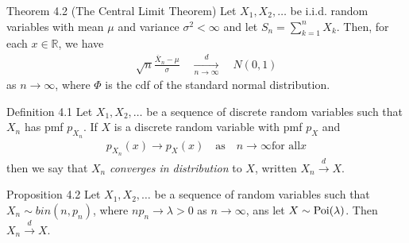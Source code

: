 \begin{boks}{Theorem 4.2 (The Central Limit Theorem)}
  Let $X_1, X_2, \ldots$ be i.i.d. random variables with mean $\mu$ and variance $\sigma^2 < \infty$ and let $S_n = \sum_{k = 1}^{n} X_k$. Then, for each $x \in \mathbb{R}$, we have
  \begin{align*}
    \sqrt{n}\frac{\bar{X}_n - \mu}{\sigma} \quad \xrightarrow[n \rightarrow \infty]{d} \quad N(0,1)
  \end{align*}
  as $n \rightarrow \infty$, where $\Phi$ is the cdf of the standard normal distribution.
\end{boks}
\begin{boks}{Definition 4.1}
  Let $X_1, X_2, \ldots$ be a sequence of discrete random variables such that $X_n$ has pmf $p_{X_n}$. If $X$ is a discrete random variable with pmf $p_X$ and
  \begin{align*}
    p_{X_n}(x) \rightarrow p_{X}(x) \quad
    \text{as} \quad n \rightarrow \infty \text{for all} x
  \end{align*}
  then we say that $X_n$ \textit{converges in distribution} to $X$, written $X_n \xrightarrow{d} X$.
\end{boks}
\begin{boks}{Proposition 4.2}
  Let $X_1, X_2, \ldots$ be a sequence of random variables such that $X_n \sim bin(n, p_n)$, where $np_n \rightarrow \lambda > 0$ as $n \rightarrow \infty$, ans let $X \sim \operatorname{Poi}(\lambda)$. Then $X_n \xrightarrow{d} X$.
\end{boks}
